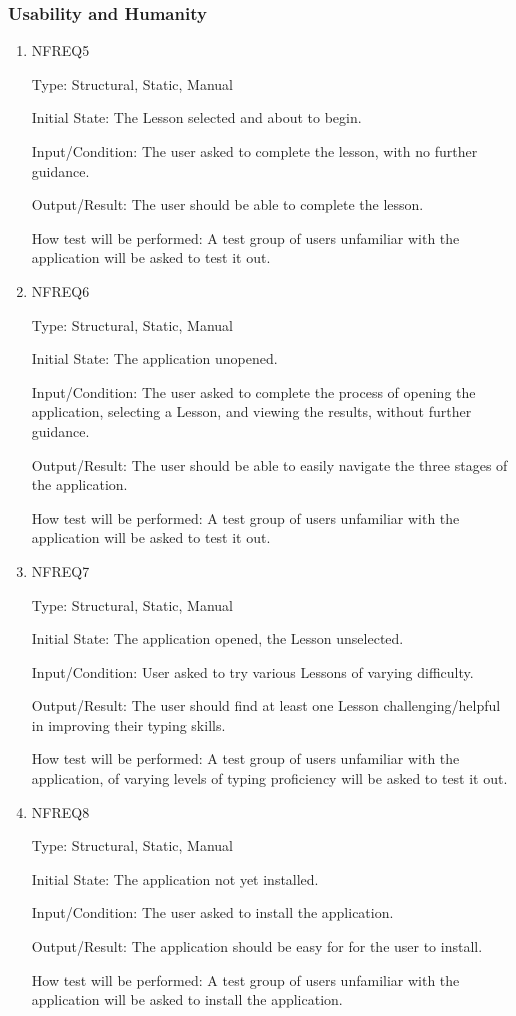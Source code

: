 \documentclass[12pt, titlepage]{article}
\begin{document}
\subsubsection{Usability and Humanity}
\begin{enumerate}

\item{NFREQ5\\}

Type: Structural, Static, Manual
					
Initial State: The Lesson selected and about to begin.
					
Input/Condition: The user asked to complete the lesson, with no further guidance.
					
Output/Result: The user should be able to complete the lesson.
					
How test will be performed: A test group of users unfamiliar with the application will be asked to test it out.

\item{NFREQ6\\}

Type: Structural, Static, Manual
					
Initial State: The application unopened.
					
Input/Condition: The user asked to complete the process of opening the application, selecting a Lesson, and viewing the results, without further guidance.
					
Output/Result: The user should be able to easily navigate the three stages of the application.
					
How test will be performed:  A test group of users unfamiliar with the application will be asked to test it out.

\item{NFREQ7\\}

Type: Structural, Static, Manual
					
Initial State: The application opened, the Lesson unselected.
					
Input/Condition: User asked to try various Lessons of varying difficulty.
					
Output/Result: The user should find at least one Lesson challenging/helpful in improving their typing skills.
					
How test will be performed:  A test group of users unfamiliar with the application, of varying levels of typing proficiency will be asked to test it out.

\item{NFREQ8\\}

Type: Structural, Static, Manual
					
Initial State: The application not yet installed.
					
Input/Condition: The user asked to install the application.
					
Output/Result: The application should be easy for for the user to install.
					
How test will be performed:  A test group of users unfamiliar with the application will be asked to install the application.

\end{enumerate}
\end{document}

